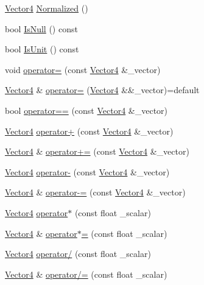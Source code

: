 \begin{DoxyCompactItemize}
\mbox{\hyperlink{structpad_1_1math_1_1_vector4}{Vector4}} \mbox{\hyperlink{structpad_1_1math_1_1_vector4_a984da7891140213ff81038628beae587}{Normalized}} ()
\item 
bool \mbox{\hyperlink{structpad_1_1math_1_1_vector4_a60b73d235abc2a5948dccbe786de338f}{Is\+Null}} () const
\item 
bool \mbox{\hyperlink{structpad_1_1math_1_1_vector4_a194b228f5e0d3d8171daaa78927a7bd3}{Is\+Unit}} () const
\item 
void \mbox{\hyperlink{structpad_1_1math_1_1_vector4_ac705833566aae9930fa13586833a535b}{operator=}} (const \mbox{\hyperlink{structpad_1_1math_1_1_vector4}{Vector4}} \&\+\_\+vector)
\item 
\mbox{\hyperlink{structpad_1_1math_1_1_vector4}{Vector4}} \& \mbox{\hyperlink{structpad_1_1math_1_1_vector4_aa8541807bf5c8c3a0b5edb851feb858a}{operator=}} (\mbox{\hyperlink{structpad_1_1math_1_1_vector4}{Vector4}} \&\&\+\_\+vector)=default
\item 
bool \mbox{\hyperlink{structpad_1_1math_1_1_vector4_afe872f9553149f12674806bb6e7eb786}{operator==}} (const \mbox{\hyperlink{structpad_1_1math_1_1_vector4}{Vector4}} \&\+\_\+vector)
\item 
\mbox{\hyperlink{structpad_1_1math_1_1_vector4}{Vector4}} \mbox{\hyperlink{structpad_1_1math_1_1_vector4_ac6b2370ae62f75e3dcb112427e3f518f}{operator+}} (const \mbox{\hyperlink{structpad_1_1math_1_1_vector4}{Vector4}} \&\+\_\+vector)
\item 
\mbox{\hyperlink{structpad_1_1math_1_1_vector4}{Vector4}} \& \mbox{\hyperlink{structpad_1_1math_1_1_vector4_aed8f9c0faacfe13f7985d5f4e4f73d23}{operator+=}} (const \mbox{\hyperlink{structpad_1_1math_1_1_vector4}{Vector4}} \&\+\_\+vector)
\item 
\mbox{\hyperlink{structpad_1_1math_1_1_vector4}{Vector4}} \mbox{\hyperlink{structpad_1_1math_1_1_vector4_a05cc7e4f760aae9610025584d1608b50}{operator-\/}} (const \mbox{\hyperlink{structpad_1_1math_1_1_vector4}{Vector4}} \&\+\_\+vector)
\item 
\mbox{\hyperlink{structpad_1_1math_1_1_vector4}{Vector4}} \& \mbox{\hyperlink{structpad_1_1math_1_1_vector4_ae27aa6827d54b1b0033ee99e79d19660}{operator-\/=}} (const \mbox{\hyperlink{structpad_1_1math_1_1_vector4}{Vector4}} \&\+\_\+vector)
\item 
\mbox{\hyperlink{structpad_1_1math_1_1_vector4}{Vector4}} \mbox{\hyperlink{structpad_1_1math_1_1_vector4_a57e32bb850ebd1b9ac4a6adf36ebfbe4}{operator$\ast$}} (const float \+\_\+scalar)
\item 
\mbox{\hyperlink{structpad_1_1math_1_1_vector4}{Vector4}} \& \mbox{\hyperlink{structpad_1_1math_1_1_vector4_a33fee52eb7633acd92f85449d261b820}{operator$\ast$=}} (const float \+\_\+scalar)
\item 
\mbox{\hyperlink{structpad_1_1math_1_1_vector4}{Vector4}} \mbox{\hyperlink{structpad_1_1math_1_1_vector4_ad818def83cbc4255b79ec185450633ca}{operator/}} (const float \+\_\+scalar)
\item 
\mbox{\hyperlink{structpad_1_1math_1_1_vector4}{Vector4}} \& \mbox{\hyperlink{structpad_1_1math_1_1_vector4_a3703b229047d4cd251215a409c8ad7a5}{operator/=}} (const float \+\_\+scalar)
\end{DoxyCompactItemize}
